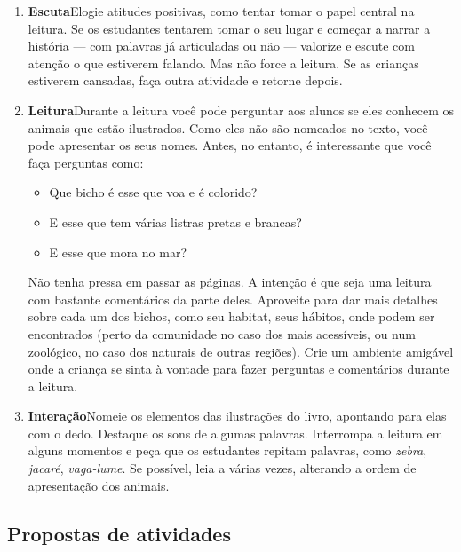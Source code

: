 \documentclass[11pt]{extarticle}
\begin{document}
\begin{enumerate}
\item \textbf{Escuta}\quad Elogie atitudes positivas, como 
tentar tomar o papel central na leitura. Se os estudantes tentarem 
tomar o seu lugar e começar a narrar a história --- com palavras já articuladas 
ou não --- valorize e escute com atenção o que estiverem falando. Mas não 
force a leitura. Se as crianças estiverem cansadas, faça outra atividade 
e retorne depois. 

\item \textbf{Leitura}\quad Durante a leitura você pode
perguntar aos alunos se eles conhecem os animais que estão ilustrados.
Como eles não são nomeados no texto, você pode apresentar os seus nomes.
Antes, no entanto, é interessante que você faça perguntas como:

\begin{itemize}
\item Que bicho é esse que voa e é colorido?
\item E esse que tem várias listras pretas e brancas?
\item E esse que mora no mar?
\end{itemize}

Não tenha pressa em passar as páginas. 
A intenção é que seja uma leitura com bastante comentários
da parte deles. Aproveite para dar mais detalhes sobre cada 
um dos bichos, como seu habitat, seus hábitos, onde podem ser
encontrados (perto da comunidade no caso dos mais acessíveis,
ou num zoológico, no caso dos naturais de outras regiões).
Crie um ambiente amigável onde a criança se sinta à vontade 
para fazer perguntas e comentários durante a leitura.


\item \textbf{Interação}\quad Nomeie os elementos das ilustrações 
do livro, apontando para elas com o dedo. Destaque os sons de algumas 
palavras. Interrompa a leitura em alguns momentos e peça que 
os estudantes repitam palavras, como \textit{zebra}, \textit{jacaré}, 
\textit{vaga-lume}. Se possível, leia a várias vezes, alterando a 
ordem de apresentação dos animais.
\end{enumerate}


\subsection{Propostas de atividades}

\end{document}

